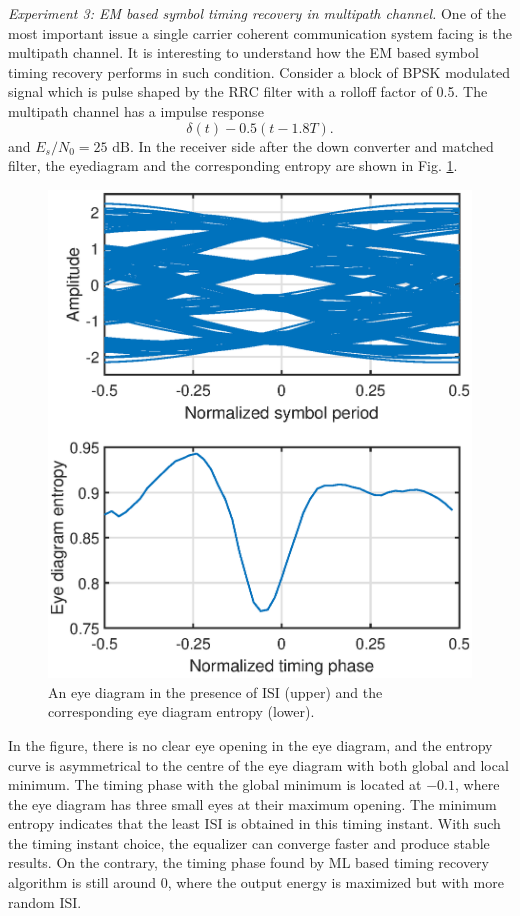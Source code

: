 \documentclass[journal,comsoc]{IEEEtran}
\begin{document}
\textit{Experiment 3:
EM based symbol timing recovery in multipath channel.}
One of the most important issue a single carrier coherent communication system facing is the multipath channel.
It is interesting to understand how the EM based symbol timing recovery performs in such condition.
Consider a block of BPSK modulated signal which is pulse shaped by the RRC filter with  a rolloff factor of 0.5.
The multipath channel has a impulse response
\begin{equation}
\delta(t)-0.5(t-1.8T).
\end{equation}
and  \(E_s/N_0 = 25 \textrm{ dB}\).  
In the receiver side after the down converter and matched filter, the eyediagram and the corresponding entropy are shown in Fig. \ref{fig:per_timing_isi}. 
\begin{figure}[ht]
\centering
\includegraphics[width=3 in]{pic/per_timing_multi.eps}
\caption{An eye diagram in the presence of ISI (upper) and the corresponding eye diagram entropy (lower).}
\label{fig:per_timing_isi} 
\end{figure} 

In the figure, there is no clear eye opening in the eye diagram, and the entropy curve is asymmetrical to the centre of the eye diagram with both global and local minimum. 
The timing phase with the global minimum is located at \(-0.1\), where the eye diagram has three small eyes at their maximum opening.
The minimum entropy indicates that the least ISI is obtained in this timing instant.
With such the timing instant choice, the equalizer can converge faster and produce stable results.
On the contrary, the timing phase found by ML based timing recovery algorithm is still around 0, 
where the output energy is maximized but with more random ISI.
\end{document}
